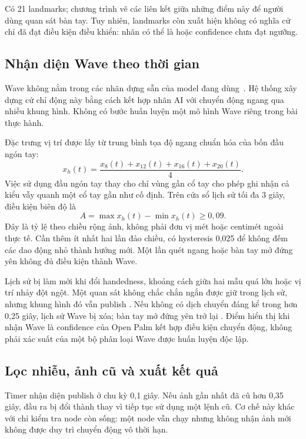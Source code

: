 \documentclass[12pt,a4paper]{article}
\newcommand{\code}[1]{\texttt{\detokenize{#1}}}
\begin{document}
Có 21 landmarks; chương trình vẽ các liên kết giữa những điểm này để người dùng quan sát bàn tay. Tuy nhiên, landmarks còn xuất hiện không có nghĩa cử chỉ đã đạt điều kiện điều khiển: nhãn có thể là \code{None} hoặc confidence chưa đạt ngưỡng.

\subsection{Nhận diện Wave theo thời gian}
Wave không nằm trong các nhãn dựng sẵn của model đang dùng~\cite{mp_overview}. Hệ thống xây dựng cử chỉ động này bằng cách kết hợp nhãn AI \code{Open_Palm} với chuyển động ngang qua nhiều khung hình. Không có bước huấn luyện một mô hình Wave riêng trong bài thực hành.

Đặc trưng vị trí được lấy từ trung bình tọa độ ngang chuẩn hóa của bốn đầu ngón tay:
\begin{equation}
 x_h(t)=\frac{x_8(t)+x_{12}(t)+x_{16}(t)+x_{20}(t)}{4}.
\end{equation}
Việc sử dụng đầu ngón tay thay cho chỉ vùng gần cổ tay cho phép ghi nhận cả kiểu vẫy quanh một cổ tay gần như cố định. Trên cửa sổ lịch sử tối đa 3 giây, điều kiện biên độ là
\begin{equation}
 A=\max x_h(t)-\min x_h(t)\geq 0{,}09.
\end{equation}
Đây là tỷ lệ theo chiều rộng ảnh, không phải đơn vị mét hoặc centimét ngoài thực tế. Cần thêm ít nhất hai lần đảo chiều, có hysteresis 0,025 để không đếm các dao động nhỏ thành hướng mới. Một lần quét ngang hoặc bàn tay mở đứng yên không đủ điều kiện thành Wave.

Lịch sử bị làm mới khi đổi handedness, khoảng cách giữa hai mẫu quá lớn hoặc vị trí nhảy đột ngột. Một quan sát không chắc chắn ngắn được giữ trong lịch sử, nhưng khung hình đó vẫn publish \code{None}. Nếu không có dịch chuyển đáng kể trong hơn 0,25 giây, lịch sử Wave bị xóa; bàn tay mở đứng yên trở lại \code{Open_Palm}. Điểm hiển thị khi nhận Wave là confidence của Open Palm kết hợp điều kiện chuyển động, không phải xác suất của một bộ phân loại Wave được huấn luyện độc lập.

\subsection{Lọc nhiễu, ảnh cũ và xuất kết quả}
Timer nhận diện publish ở chu kỳ 0,1 giây. Nếu ảnh gần nhất đã cũ hơn 0,35 giây, đầu ra bị đổi thành \code{None} thay vì tiếp tục sử dụng một lệnh cũ. Cơ chế này khác với chỉ kiểm tra node còn sống: một node vẫn chạy nhưng không nhận ảnh mới không được duy trì chuyển động vô thời hạn.
\end{document}
